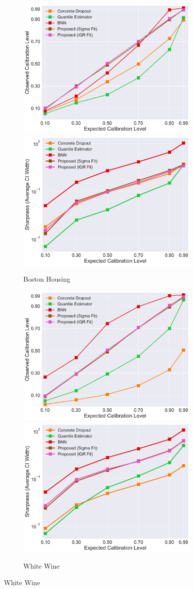 \documentclass[letterpaper]{article} %
\begin{document}
\begin{figure}[t]
	\centering
	\begin{subfigure}[b]{0.48\textwidth}
	        \centering
			\includegraphics[width=0.48\linewidth, keepaspectratio=true]{boston.pdf}
			\includegraphics[width=0.48\linewidth, keepaspectratio=true]{boston-cvsws.pdf}
		\caption{Boston Housing}
	    \label{fig:boston}
    \end{subfigure}
    \begin{subfigure}[b]{0.48\textwidth}
	        \centering
			\includegraphics[width=0.48\linewidth, keepaspectratio=true]{whitewine.pdf}
			\includegraphics[width=0.48\linewidth, keepaspectratio=true]{whitewine-cvsws.pdf}
		\caption{White Wine}
	    \label{fig:whitewine}
    \end{subfigure}


\end{figure}
\end{document}
